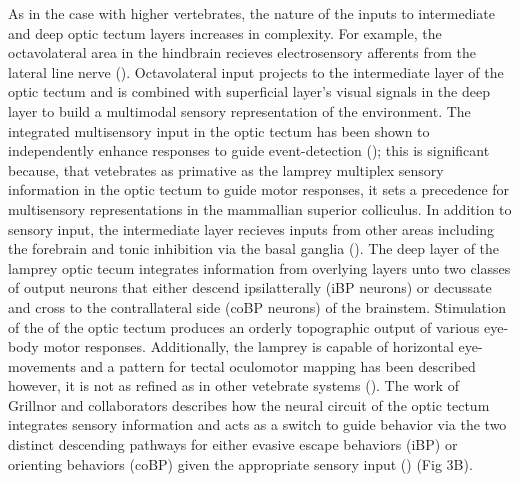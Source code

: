 \documentclass{ar-1col}
\begin{document}
{As in the case with higher vertebrates, the nature of the inputs to intermediate and deep optic tectum layers increases in complexity. For example, the octavolateral area in the hindbrain recieves electrosensory afferents from the lateral line nerve (\cite{bodznick1981electroreception}). Octavolateral input projects to the intermediate layer of the optic tectum and is combined with superficial layer's visual signals in the deep layer to build a multimodal sensory representation of the environment. The integrated multisensory input in the optic tectum has been shown to independently enhance responses to guide event-detection (\cite{kardamakis2016spatiotemporal}); this is significant because, that vetebrates as primative as the lamprey multiplex sensory information in the optic tectum to guide motor responses, it sets a precedence for multisensory representations in the mammallian superior colliculus. In addition to sensory input, the intermediate layer recieves inputs from other areas including the forebrain and tonic inhibition via the basal ganglia (\cite{robertson2006afferents}). The deep layer of the lamprey optic tecum integrates information from overlying layers unto two classes of output neurons that either descend ipsilatterally (iBP neurons) or decussate and cross to the contrallateral side (coBP neurons) of the brainstem. Stimulation of the of the optic tectum produces an orderly topographic output of various eye-body motor responses. Additionally, the lamprey is capable of horizontal eye-movements and a pattern for tectal oculomotor mapping has been described however, it is not as refined as in other vetebrate systems (\cite{saitoh2007tectal}). The work of Grillnor and collaborators describes how the neural circuit of the optic tectum integrates sensory information and acts as a switch to guide behavior via the two distinct descending pathways for either evasive escape behaviors (iBP) or orienting behaviors (coBP) given the appropriate sensory input (\cite{suzuki2019role}) (Fig 3B).

}
\end{document}
